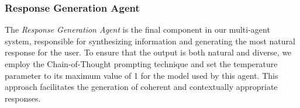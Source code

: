 \documentclass[runningheads]{llncs}
\begin{document}
\subsubsection{Response Generation Agent}

The \textit{Response Generation Agent} is the final component in our multi-agent system, responsible for synthesizing information and generating the most natural response for the user. To ensure that the output is both natural and diverse, we employ the Chain-of-Thought prompting technique \cite{10.5555/3600270.3602070} and set the temperature parameter to its maximum value of 1 for the model used by this agent. This approach facilitates the generation of coherent and contextually appropriate responses.




\end{document}
